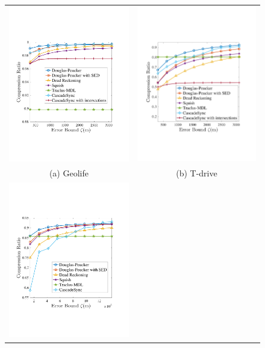 \tabcolsep=0pt
\begin{figure}[!htb]
\centering
\begin{tabular}{cc}
\includegraphics[width=60mm]{pics/geolife.pdf}&
\includegraphics[width=60mm]{pics/tdrive.pdf}\\
(a) Geolife & (b) T-drive \\
\includegraphics[width=60mm]{pics/hurricane.pdf}&

\end{tabular}
\end{figure}
